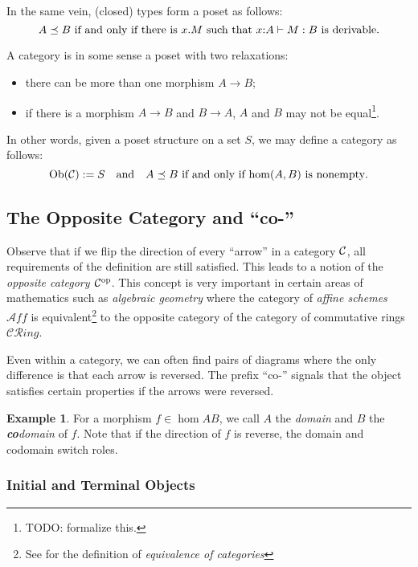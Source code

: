 \documentclass[11pt]{article}
\theoremstyle{definition}
\newtheorem{example}[theorem]{Example}
\begin{document}
In the same vein, (closed) types form a poset as follows:
\[ A \preceq B \text{ if and only if there is } x.M \text{ such that } x{:}A \vdash \oftype{M}{B} \text{ is derivable}. \]

A category is in some sense a poset with two relaxations:
\begin{itemize}
\item there can be more than one morphism $A\to B$;
\item if there is a morphism $A\to B$ and $B\to A$, $A$ and $B$ may not be equal\footnote{TODO: formalize this.}.
\end{itemize}

In other words, given a poset structure on a set $S$, we may define a category as follows:
\[ \mathrm{Ob}(\mathcal{C}):= S \quad \text{and} \quad A \preceq B \text{ if and only if } \mathrm{hom}(A, B) \text{ is nonempty}. \]

\subsection{The Opposite Category and ``co-''}

Observe that if we flip the direction of every ``arrow'' in a category $\mathcal{C}$, all requirements of the definition are still satisfied. This leads to a notion of the \textit{opposite category $\mathcal{C}^{\mathrm{op}}$}. This concept is very important in certain areas of mathematics such as \textit{algebraic geometry} where the category of \textit{affine schemes} $\mathcal{A}f\!f$ is equivalent\footnote{See  for the definition of \textit{equivalence of categories}} to the opposite category of the category of commutative rings $\mathcal{CR}ing$.

Even within a category, we can often find pairs of diagrams where the only difference is that each arrow is reversed. The prefix ``co-'' signals that the object satisfies certain properties if the arrows were reversed.

\begin{example}
  For a morphism $f\in\hom{A}{B}$, we call $A$ the \textit{domain} and $B$ the \textit{\textbf{co}domain} of $f$. Note that
  if the direction of $f$ is reverse, the domain and codomain switch roles.
\end{example}

\subsubsection{Initial and Terminal Objects}
\end{document}
